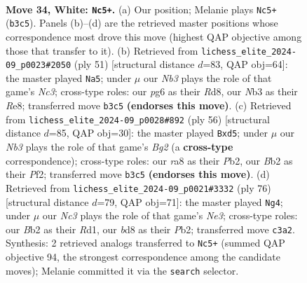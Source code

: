 \documentclass[11pt]{article}
\begin{document}
\clearpage

\begin{figure}[p]\centering
\begin{subfigure}{0.46\textwidth}\centering
\resizebox{\linewidth}{!}{%
\newchessgame
\chessboard[
  setfen={rn1b2r1/1p1k1b1p/6pP/p2pPp2/P7/1NN3P1/1B4K1/R4R2 w - - 11 34},
  showmover=false,
  pgfstyle=straightmove, color=movearrow, markmove={b3-c5}
]}
\caption{}
\end{subfigure}\hfill
\begin{subfigure}{0.46\textwidth}\centering
\resizebox{\linewidth}{!}{%
\newchessgame
\chessboard[
  setfen={3rr1k1/pp3pb1/2n3pp/4P3/P1p5/2Pp2BP/1P1N1PP1/3RR1K1 b - - 1 26},
  showmover=false,
  pgfstyle=straightmove, color=movearrow, markmove={c6-a5}
]}
\caption{}
\end{subfigure}
\\[4pt]
\begin{subfigure}{0.46\textwidth}\centering
\resizebox{\linewidth}{!}{%
\newchessgame
\chessboard[
  setfen={4r3/pp3rbk/2p3pp/2Nn4/3p3P/3R2P1/PP3PB1/5RK1 w - - 0 29},
  showmover=false,
  pgfstyle=straightmove, color=movearrow, markmove={g2-d5}
]}
\caption{}
\end{subfigure}\hfill
\begin{subfigure}{0.46\textwidth}\centering
\resizebox{\linewidth}{!}{%
\newchessgame
\chessboard[
  setfen={3r4/1k1rn3/1p3p2/p2pb1p1/P7/2PRN1PP/1P3BK1/3R4 w - - 9 39},
  showmover=false,
  pgfstyle=straightmove, color=movearrow, markmove={e3-g4}
]}
\caption{}
\end{subfigure}
\caption{\textbf{Move 34, White: \texttt{Nc5+}.} (a) Our position; Melanie plays \texttt{Nc5+} (\texttt{b3c5}). Panels (b)--(d) are the retrieved master positions whose correspondence most drove this move (highest QAP objective among those that transfer to it). (b) Retrieved from \texttt{lichess\_elite\_2024-09\_p0023\#2050} (ply 51) [structural distance $d$=83, QAP obj=64]: the master played \texttt{Na5}; under $\mu$ our \emph{Nb3} plays the role of that game's \emph{Nc3}; cross-type roles: our \emph{p}g6 as their \emph{R}d8, our \emph{N}b3 as their \emph{R}e8; transferred move \texttt{b3c5} \textbf{(endorses this move)}. (c) Retrieved from \texttt{lichess\_elite\_2024-09\_p0028\#892} (ply 56) [structural distance $d$=85, QAP obj=30]: the master played \texttt{Bxd5}; under $\mu$ our \emph{Nb3} plays the role of that game's \emph{Bg2} (a \textbf{cross-type} correspondence); cross-type roles: our \emph{r}a8 as their \emph{P}b2, our \emph{B}b2 as their \emph{P}f2; transferred move \texttt{b3c5} \textbf{(endorses this move)}. (d) Retrieved from \texttt{lichess\_elite\_2024-09\_p0021\#3332} (ply 76) [structural distance $d$=79, QAP obj=71]: the master played \texttt{Ng4}; under $\mu$ our \emph{Nc3} plays the role of that game's \emph{Ne3}; cross-type roles: our \emph{B}b2 as their \emph{R}d1, our \emph{b}d8 as their \emph{P}b2; transferred move \texttt{c3a2}. Synthesis: 2 retrieved analogs transferred to \texttt{Nc5+} (summed QAP objective 94, the strongest correspondence among the candidate moves); Melanie committed it via the \texttt{search} selector.}
\label{fig:thought-m66}
\end{figure}
\end{document}
